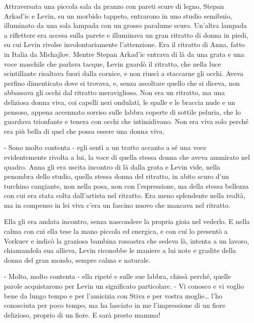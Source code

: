 Attraversata una piccola sala da pranzo con pareti scure di legno, Stepan Arkad'ic e Levin, su un morbido tappeto, entrarono in uno studio semibuio, illuminato da una sola lampada con un grosso paralume scuro. Un'altra lampada a riflettere era accesa sulla parete e illuminava un gran ritratto di donna in piedi, su cui Levin rivolse involontariamente l'attenzione. Era il ritratto di Anna, fatto in Italia da Michajlov. Mentre Stepan Arkad'ic entrava di là da una grata e una voce maschile che parlava tacque, Levin guardò il ritratto, che nella luce scintillante risaltava fuori dalla cornice, e non riuscì a staccarne gli occhi. Aveva perfino dimenticato dove si trovava, e, senza ascoltare quello che si diceva, non abbassava gli occhi dal ritratto meraviglioso. Non era un ritratto, ma una deliziosa donna viva, coi capelli neri ondulati, le spalle e le braccia nude e un pensoso, appena accennato sorriso sulle labbra coperte di sottile peluria, che lo guardava trionfante e tenera con occhi che intimidivano. Non era viva solo perché era più bella di quel che possa essere una donna viva. 

- Sono molto contenta - egli sentì a un tratto accanto a sé una voce evidentemente rivolta a lui, la voce di quella stessa donna che aveva ammirato nel quadro. Anna gli era uscita incontro di là dalla grata e Levin vide, nella penombra dello studio, quella stessa donna del ritratto, in abito scuro d'un turchino cangiante, non nella posa, non con l'espressione, ma della stessa bellezza con cui era stata colta dall'artista nel ritratto. Era meno splendente nella realtà, ma in compenso in lei viva c'era un fascino nuovo che mancava nel ritratto. 

\label{x-6} 

Ella gli era andata incontro, senza nascondere la propria gioia nel vederlo. E nella calma con cui ella tese la mano piccola ed energica, e con cui lo presentò a Vorkuev e indicò la graziosa bambina rossastra che sedeva là, intenta a un lavoro, chiamandola sua allieva, Levin riconobbe le maniere a lui note e gradite della donna del gran mondo, sempre calma e naturale. 

- Molto, molto contenta - ella ripeté e sulle sue labbra, chissà perché, quelle parole acquistarono per Levin un significato particolare. - Vi conosco e vi voglio bene da lungo tempo e per l'amicizia con Stiva e per vostra moglie\ldots{} l'ho conosciuta per poco tempo, ma ha lasciato in me l'impressione di un fiore delizioso, proprio di un fiore. E sarà presto mamma! 


